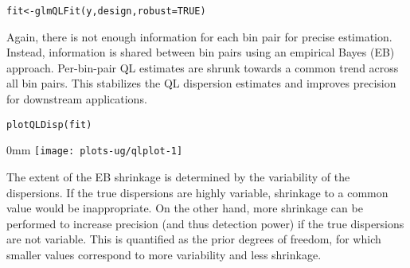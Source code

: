 \documentclass{report}\usepackage[]{graphicx}\usepackage[usenames,dvipsnames]{color}
\makeatletter
\def\maxwidth{ %
  \ifdim\Gin@nat@width>\linewidth
    \linewidth
  \else
    \Gin@nat@width
  \fi
}
\newcommand{\hlnum}[1]{\textcolor[rgb]{0.816,0.125,0.439}{#1}}%
\newcommand{\hlopt}[1]{\textcolor[rgb]{0,0,0}{#1}}%
\newcommand{\hlstd}[1]{\textcolor[rgb]{0.251,0.251,0.251}{#1}}%
\newcommand{\hlkwb}[1]{\textcolor[rgb]{0,0,0}{#1}}%
\newcommand{\hlkwc}[1]{\textcolor[rgb]{0.251,0.251,0.251}{#1}}%
\newcommand{\hlkwd}[1]{\textcolor[rgb]{0.878,0.439,0.125}{#1}}%
\newenvironment{knitrout}{}{} %
\makeatother
\begin{document}
\begin{knitrout}
\color{fgcolor}\begin{kframe}
\begin{alltt}
\hlstd{fit} \hlkwb{<-} \hlkwd{glmQLFit}\hlstd{(y, design,} \hlkwc{robust}\hlstd{=}\hlnum{TRUE}\hlstd{)}
\end{alltt}
\end{kframe}
\end{knitrout}

Again, there is not enough information for each bin pair for precise estimation.
Instead, information is shared between bin pairs using an empirical Bayes (EB) approach.
Per-bin-pair QL estimates are shrunk towards a common trend across all bin pairs.
This stabilizes the QL dispersion estimates and improves precision for downstream applications.

\begin{knitrout}
\color{fgcolor}\begin{kframe}
\begin{alltt}
\hlkwd{plotQLDisp}\hlstd{(fit)}
\end{alltt}
\end{kframe}\begin{adjustwidth}{\fltoffset}{0mm}
\texttt{[image: plots-ug/qlplot-1]} \end{adjustwidth}
\end{knitrout}

The extent of the EB shrinkage is determined by the variability of the dispersions.
If the true dispersions are highly variable, shrinkage to a common value would be inappropriate.
On the other hand, more shrinkage can be performed to increase precision (and thus detection power) if the true dispersions are not variable.
This is quantified as the prior degrees of freedom, for which smaller values correspond to more variability and less shrinkage.

\begin{knitrout}
\color{fgcolor}
\end{knitrout}
\end{document}
